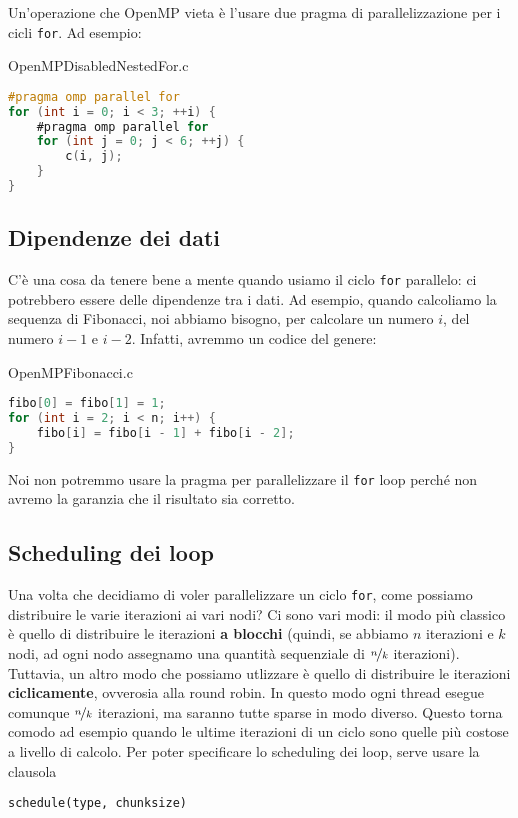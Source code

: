 Un'operazione che OpenMP vieta è l'usare due pragma di parallelizzazione per i cicli \verb|for|. Ad esempio:

\begin{codeblock}{OpenMPDisabledNestedFor.c}
    \begin{lstlisting}[language = C]
#pragma omp parallel for
for (int i = 0; i < 3; ++i) {
    #pragma omp parallel for
    for (int j = 0; j < 6; ++j) {
        c(i, j);
    }
}\end{lstlisting}
\end{codeblock}

\subsection{Dipendenze dei dati}

C'è una cosa da tenere bene a mente quando usiamo il ciclo \verb|for| parallelo: ci potrebbero essere delle dipendenze tra i dati. Ad esempio, quando calcoliamo la sequenza di Fibonacci, noi abbiamo bisogno, per calcolare un numero $i$, del numero $i - 1$ e $i - 2$. Infatti, avremmo un codice del genere:

\begin{codeblock}{OpenMPFibonacci.c}
    \begin{lstlisting}[language = C]
fibo[0] = fibo[1] = 1;
for (int i = 2; i < n; i++) {
    fibo[i] = fibo[i - 1] + fibo[i - 2];
}\end{lstlisting}
\end{codeblock}

Noi non potremmo usare la pragma per parallelizzare il \verb|for| loop perché non avremo la garanzia che il risultato sia corretto.


\subsection{Scheduling dei loop}

Una volta che decidiamo di voler parallelizzare un ciclo \verb|for|, come possiamo distribuire le varie iterazioni ai vari nodi? Ci sono vari modi: il modo più classico è quello di distribuire le iterazioni \textbf{a blocchi} (quindi, se abbiamo $n$ iterazioni e $k$ nodi, ad ogni nodo assegnamo una quantità sequenziale di $\nicefrac{n}{k}$ iterazioni). Tuttavia, un altro modo che possiamo utlizzare è quello di distribuire le iterazioni \textbf{ciclicamente}, ovverosia alla round robin. In questo modo ogni thread esegue comunque $\nicefrac{n}{k}$ iterazioni, ma saranno tutte sparse in modo diverso. Questo torna comodo ad esempio quando le ultime iterazioni di un ciclo sono quelle più costose a livello di calcolo.
\nwl
Per poter specificare lo scheduling dei loop, serve usare la clausola 
\begin{center}
    \verb|schedule(type, chunksize)|
\end{center}

